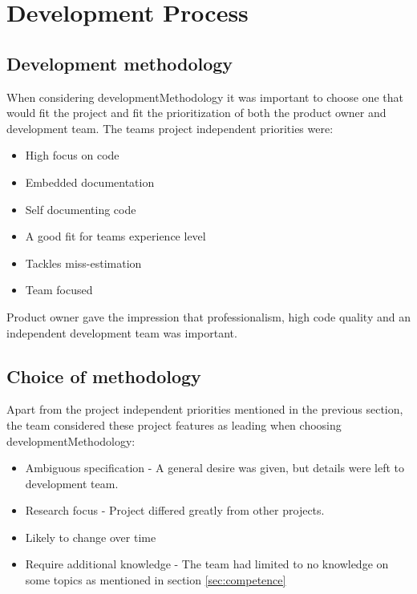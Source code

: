 \chapter{Development Process}
\label{chap:process}

\section{Development methodology}

When considering \gls{developmentMethodology} it was important to choose one that would fit the project and fit the prioritization of both the product owner and development team.
The teams project independent priorities were:
\begin{itemize}
    \item High focus on code
    \item Embedded documentation
    \item Self documenting code
    \item A good fit for teams experience level
    \item Tackles miss-estimation
    \item Team focused
\end{itemize}

Product owner gave the impression that professionalism, high code quality and an independent development team was important.

\section{Choice of methodology}

Apart from the project independent priorities mentioned in the previous section, the team considered these project features as leading when choosing \gls{developmentMethodology}:

\begin{itemize}
    \item Ambiguous specification - A general desire was given, but details were left to development team.
    \item Research focus - Project differed greatly from other projects.
    \item Likely to change over time
    \item Require additional knowledge - The team had limited to no knowledge on some topics as mentioned in section \ref{sec:competence}
\end{itemize}


